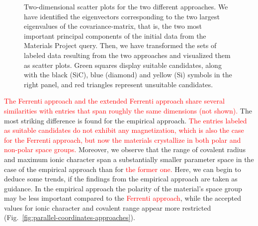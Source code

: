 \documentclass[superscriptaddress,unsortedaddress,
 amsmath,amssymb,
 aps,
]{revtex4-2}
\newcommand{\mrk}[1]{\textcolor{red}{#1}}
\begin{document}
\begin{figure}
\begin{subfigure}{0.35\textwidth}
    \end{subfigure}
    \caption{Two-dimensional scatter plots for the two different approaches. We have identified the eigenvectors corresponding to the two largest eigenvalues of the covariance-matrix, that is, the two most important principal components of the initial data from the Materials Project query. Then, we have transformed the sets of labeled data resulting from the two approaches and visualized them as scatter plots. Green squares display suitable candidates, along with the black (SiC), blue (diamond) and yellow (Si) symbols in the right panel, and red triangles represent unsuitable candidates.}
    \label{fig:2dscatterplotpca}
\end{figure}


\mrk{The Ferrenti approach and the extended Ferrenti approach share several similarities with entries that span roughly the same dimensions (not shown).} 
The most striking difference is found for the empirical approach. \mrk{The entries labeled as suitable candidates do not exhibit any magnetization, which is also the case for the Ferrenti approach, but now the materials crystallize in both polar and non-polar space groups.} Moreover, we observe that the range of covalent radius and maximum ionic character span a substantially smaller parameter space in the case of the empirical approach than for \mrk{the former one.} 
Here, we can begin to deduce some trends, if the findings from the empirical approach are taken as guidance. In the empirical approach the polarity of the material's space group may be less important compared to the \mrk{Ferrenti approach}, while the accepted values for ionic character and covalent range appear more restricted (Fig.~\ref{fig:parallel-coordinates-approaches}). 
\end{document}
